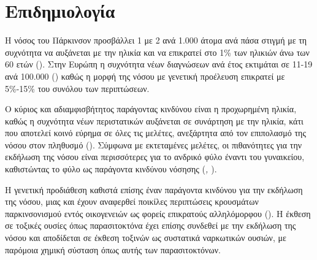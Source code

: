 \documentclass[12pt]{report}
\begin{document}
        \section{Επιδημιολογία}
        Η νόσος του Πάρκινσον προσβάλλει 1 με 2 ανά 1.000 άτομα ανά πάσα στιγμή με τη συχνότητα να αυξάνεται με την ηλικία και να επικρατεί στο 1\% των ηλικιών άνω των 60 ετών (\emph{\cite{Tysnes2017EpidemiologyDisease}}). Στην Ευρώπη η συχνότητα νέων διαγνώσεων ανά έτος εκτιμάται σε 11-19 ανά 100.000 (\emph{\cite{Balestrino2020ParkinsonDisease}}) καθώς η μορφή της νόσου με γενετική προέλευση επικρατεί με 5\%-15\% του συνόλου των περιπτώσεων.
        \par
        Ο κύριος και αδιαμφισβήτητος παράγοντας κινδύνου είναι η προχωρημένη ηλικία, καθώς η συχνότητα νέων περιστατικών αυξάνεται σε συνάρτηση με την ηλικία, κάτι που αποτελεί κοινό εύρημα σε όλες τις μελέτες, ανεξάρτητα από τον επιπολασμό της νόσου στον πληθυσμό (\emph{\cite{Tanner2005EPIDEMIOLOGYDISEASE}}). Σύμφωνα με εκτεταμένες μελέτες, οι πιθανότητες για την εκδήλωση της νόσου είναι περισσότερες για το ανδρικό φύλο έναντι του γυναικείου, καθιστώντας το φύλο ως παράγοντα κινδύνου νόσησης (\emph{\cite{Baldereschi2000ParkinsonsMen}, \cite{VanDenEeden2003IncidenceRace/Ethnicity}}). 
        \par
        Η γενετική προδιάθεση καθιστά επίσης έναν παράγοντα κινδύνου για την εκδήλωση της νόσου, μιας και έχουν αναφερθεί ποικίλες περιπτώσεις κρουσμάτων παρκινσονισμού εντός οικογενειών ως φορείς επικρατούς αλληλόμορφου  (\emph{\cite{Tanner2005EPIDEMIOLOGYDISEASE}}). Η έκθεση σε τοξικές ουσίες όπως παρασιτοκτόνα έχει επίσης συνδεθεί με την εκδήλωση της νόσου και αποδίδεται σε έκθεση τοξινών ως συστατικά ναρκωτικών ουσιών, με παρόμοια χημική σύσταση όπως αυτής των παρασιτοκτόνων.
        
\end{document}
